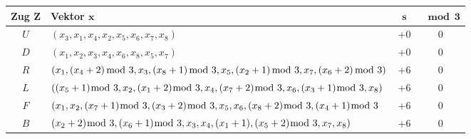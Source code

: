 \documentclass[12pt,a4paper, usenames, dvipsnames]{article}
\theoremstyle{mystyle}
\theoremstyle{definition}
\begin{document}
\begin{adjustbox}{width=1\textwidth,center}
\begin{tabular}{c l c c }
\toprule

\textbf{Zug} $\boldsymbol{Z}$ & \textbf{Vektor} $\boldsymbol{x}$ & $\boldsymbol{s}$  & $\boldsymbol{\mod 3}$ \\

\midrule

$U$ & $(x_3, x_1,x_4,x_2,x_5,x_6,x_7,x_8)$ & +0 & 0 \\

$D$ & $(x_1,x_2,x_3,x_4,x_6,x_8,x_5,x_7)$ & +0 & 0 \\

$R$ & $(x_1,(x_4 + 2) \hspace*{-0.5em} \mod 3,x_3,(x_8 + 1) \hspace*{-0.5em} \mod 3,x_5,(x_2 +1) \hspace*{-0.5em} \mod 3,x_7,(x_6 + 2) \hspace*{-0.5em} \mod 3)$ & +6 & 0 \\

$L$ & $((x_5 + 1) \hspace*{-0.6em} \mod 3, x_2, (x_1 + 2) \hspace*{-0.6em} \mod 3, x_4, (x_7 + 2) \hspace*{-0.6em} \mod 3, x_6, (x_3 + 1) \hspace*{-0.6em} \mod 3, x_8)$ & +6 & 0 \\

$F$ & $(x_1, x_2, (x_7 +1) \hspace*{-0.6em} \mod 3, (x_3 + 2)  \hspace*{-0.6em} \mod 3, x_5, x_6, (x_8 +2)  \hspace*{-0.6em} \mod 3, (x_4 + 1) \hspace*{-0.6em} \mod 3$ & +6 & 0 \\

$B$ & $(x_2 +2) \hspace*{-0.6em} \mod 3, (x_6 + 1)  \hspace*{-0.6em} \mod 3, x_3, x_4,(x_1 + 1), (x_5 + 2)  \hspace*{-0.6em} \mod 3, x_7, x_8)$ & +6 & 0 \\

\bottomrule
\end{tabular}
\end{adjustbox}
\ \\
\end{document}

